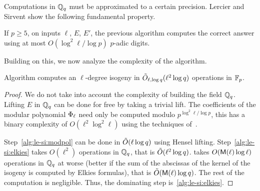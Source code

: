 Computations in $\mathbb{Q}_q$ must be approximated to a certain
precision. Lercier and Sirvent show the following fundamental
property.

\begin{proposition}
  \label{th:ls-diffeq}
  If $p\ge5$, on inputs $\ell$, $E$, $E'$, the previous algorithm
  computes the correct answer using at most $O(\log^2\ell/\log p)$
  $p$-adic digits.
\end{proposition}

Building on this, we now analyze the complexity of the algorithm.

\begin{proposition}
  \label{th:lercier-sirvent}
  Algorithm  computes an
  $\ell$-degree isogeny in $\tilde{O}_{\ell,\log q}(\ell^2\log q)$
  operations in $\mathbb{F}_p$.
\end{proposition}
\begin{proof}
  We do not take into account the complexity of building the field
  $\mathbb{Q}_q$. Lifting $E$ in $\mathbb{Q}_q$ can be done for free by taking a
  trivial lift. The coefficients of the modular polynomial
  $\Phi_\ell$ need only be computed modulo $p^{\log^2\ell/\log p}$,
  this has a binary complexity of $O(\ell^2\log^2\ell)$ using the
  techniques of~\cite{sutherland10:modpol}.

  Step~\ref{alg:le-si:modpol} can be done in $\tilde{O}(\ell\log q)$
  using Hensel lifting. Step~\ref{alg:le-si:elkies} takes $O(\ell^2)$
  operations in $\mathbb{Q}_q$, that is $\tilde{O}(\ell^2\log
  q)$.  takes $O(\mathsf{M}(\ell)\log\ell)$ operations
  in $\mathbb{Q}_q$ at worse (better if the sum of the abscissas of the kernel
  of the isogeny is computed by Elkies formulas), that is
  $\tilde{O}(\mathsf{M}(\ell)\log q)$. The rest of the computation is
  negligible. Thus, the dominating step is~\ref{alg:le-si:elkies}.
\end{proof}

